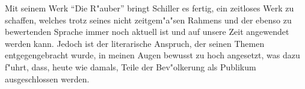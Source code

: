 Mit seinem Werk "`Die R"auber"' bringt Schiller es fertig, ein zeitloses Werk zu schaffen, welches trotz seines nicht zeitgem"a"sen Rahmens und der ebenso zu bewertenden Sprache immer noch aktuell ist und auf unsere Zeit angewendet werden kann. Jedoch ist der literarische Anspruch, der seinen Themen entgegengebracht wurde, in meinen Augen bewusst zu hoch angesetzt, was dazu f"uhrt, dass,  heute wie damals, Teile der Bev"olkerung als Publikum ausgeschlossen werden.